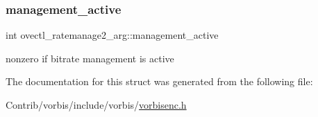 \subsubsection{\texorpdfstring{management\+\_\+active}{management\_active}}
{\footnotesize\ttfamily int ovectl\+\_\+ratemanage2\+\_\+arg\+::management\+\_\+active}

nonzero if bitrate management is active 

The documentation for this struct was generated from the following file\+:\begin{DoxyCompactItemize}
\item 
Contrib/vorbis/include/vorbis/\mbox{\hyperlink{vorbisenc_8h}{vorbisenc.\+h}}\end{DoxyCompactItemize}
